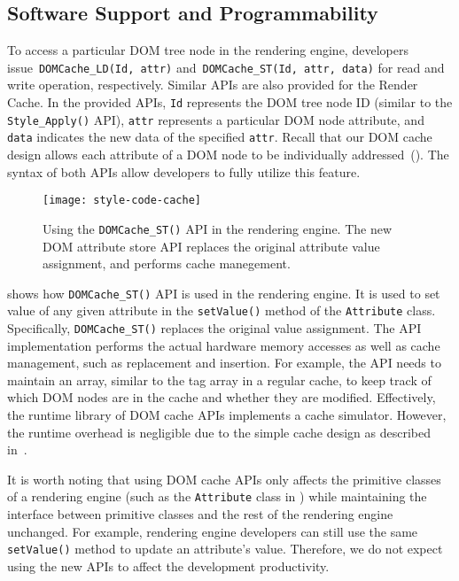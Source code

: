 \subsection{Software Support and Programmability}
\label{sec:cache:sw}

To access a particular DOM tree node in the rendering engine, developers issue~\texttt{DOMCache\_LD(Id, attr)} and~\texttt{DOMCache\_ST(Id, attr, data)} for read and write operation, respectively. Similar APIs are also provided for the Render Cache. In the provided APIs, \texttt{Id} represents the DOM tree node ID (similar to the \texttt{Style\_Apply()} API), \texttt{attr} represents a particular DOM node attribute, and \texttt{data} indicates the new data of the specified \texttt{attr}. Recall that our DOM cache design allows each attribute of a DOM node to be individually addressed~(). The syntax of both APIs allow developers to fully utilize this feature.

\begin{figure}[b]
\centering
\captionsetup{width=\columnwidth}
\texttt{[image: style-code-cache]}
\caption{Using the \texttt{DOMCache\_ST()} API in the rendering engine. The new DOM attribute store API replaces the original attribute value assignment, and performs cache manegement.}
\label{fig:style-code-cache}
\end{figure}

 shows how \texttt{DOMCache\_ST()} API is used in the rendering engine. It is used to set value of any given attribute in the \texttt{setValue()} method of the \texttt{Attribute} class. Specifically, \texttt{DOMCache\_ST()} replaces the original value assignment. The API implementation performs the actual hardware memory accesses as well as cache management, such as replacement and insertion. For example, the API needs to maintain an array, similar to the tag array in a regular cache, to keep track of which DOM nodes are in the cache and whether they are modified.  Effectively, the runtime library of DOM cache APIs implements a cache simulator. However, the runtime overhead is negligible due to the simple cache design as described in~.

It is worth noting that using DOM cache APIs only affects the primitive classes of a rendering engine (such as the \texttt{Attribute} class in ) while maintaining the interface between primitive classes and the rest of the rendering engine unchanged. For example, rendering engine developers can still use the same \texttt{setValue()} method to update an attribute's value. Therefore, we do not expect using the new APIs to affect the development productivity.

